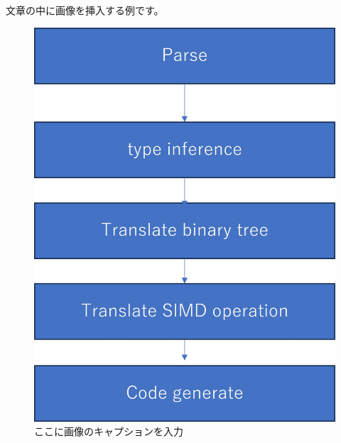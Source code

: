 \documentclass[ams, a4j]{../U-AizuGT}
\begin{document}
文章の中に画像を挿入する例です。

\begin{figure}[htbp]
\centering
\includegraphics[width=\columnwidth]{../flowchartver4.jpg}
\caption{ここに画像のキャプションを入力}
\label{fig:image1}
\end{figure}
\end{document}
